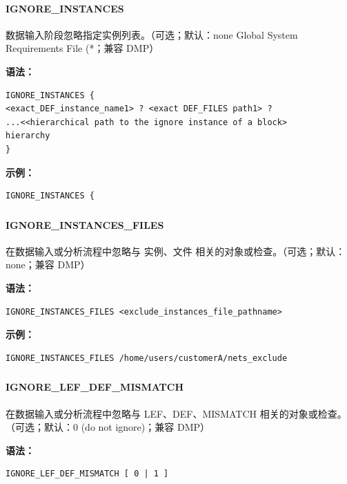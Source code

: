 \paragraph*{IGNORE_INSTANCES}

数据输入阶段忽略指定实例列表。（可选；默认：none Global System Requirements File (*；兼容 DMP）

\textbf{语法：}
\begin{lstlisting}
IGNORE_INSTANCES {
<exact_DEF_instance_name1> ? <exact DEF_FILES path1> ?
...<<hierarchical path to the ignore instance of a block>
hierarchy
}
\end{lstlisting}

\textbf{示例：}
\begin{lstlisting}
IGNORE_INSTANCES {
\end{lstlisting}

\subsubsection{}
\paragraph*{IGNORE_INSTANCES_FILES}

在数据输入或分析流程中忽略与 实例、文件 相关的对象或检查。（可选；默认：none；兼容 DMP）

\textbf{语法：}
\begin{lstlisting}
IGNORE_INSTANCES_FILES <exclude_instances_file_pathname>
\end{lstlisting}

\textbf{示例：}
\begin{lstlisting}
IGNORE_INSTANCES_FILES /home/users/customerA/nets_exclude
\end{lstlisting}

\subsubsection{}
\paragraph*{IGNORE_LEF_DEF_MISMATCH}

在数据输入或分析流程中忽略与 LEF、DEF、MISMATCH 相关的对象或检查。（可选；默认：0 (do not ignore)；兼容 DMP）

\textbf{语法：}
\begin{lstlisting}
IGNORE_LEF_DEF_MISMATCH [ 0 | 1 ]
\end{lstlisting}

